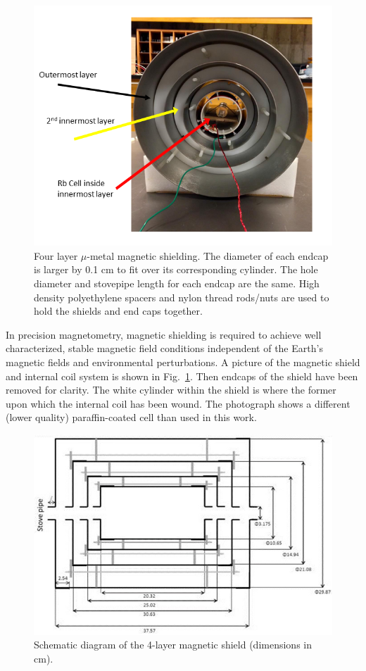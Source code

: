 \begin{figure}%
\centering
\includegraphics[width=0.8\linewidth]{figures/magnetic_shielding}
\caption{Four layer $\mu$-metal magnetic shielding. The diameter of
  each endcap is larger by 0.1 cm to fit over its corresponding
  cylinder. The hole diameter and stovepipe length for each endcap are
  the same. High density polyethylene spacers and nylon thread
  rods/nuts are used to hold the shields and end caps
  together.\label{fig:shield-picture}}
\end{figure}

In precision magnetometry, magnetic shielding is required to achieve
well characterized, stable magnetic field conditions independent of
the Earth’s magnetic fields and environmental perturbations.  A
picture of the magnetic shield and internal coil system is shown in
Fig.~\ref{fig:shield-picture}.  Then endcaps of the shield have been
removed for clarity.  The white cylinder within the shield is where
the former upon which the internal coil has been wound.  The
photograph shows a different (lower quality) paraffin-coated cell than
used in this work.

\begin{figure}%
\centering
\includegraphics[width=0.8\linewidth]{figures/shield.JPG}
\caption{Schematic diagram of the 4-layer magnetic shield (dimensions
  in cm).\label{fig:shield}}
\end{figure}


